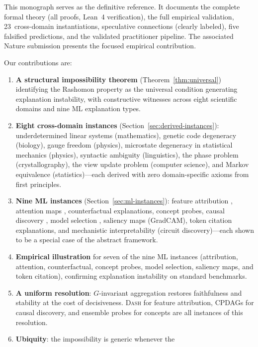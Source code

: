 \documentclass[11pt,a4paper]{article}
\newcommand{\DASH}{\textsc{Dash}}
\begin{document}
This monograph serves as the definitive reference.  It documents the
complete formal theory (all proofs, Lean~4 verification), the full
empirical validation, 23~cross-domain instantiations, speculative
connections (clearly labeled), five falsified predictions, and the
validated practitioner pipeline.  The associated Nature submission
presents the focused empirical contribution.

Our contributions are:
\begin{enumerate}[label=(\arabic*)]
  \item \textbf{A structural impossibility theorem}
    (Theorem~\ref{thm:universal}) identifying the Rashomon property
    as the universal condition generating explanation instability,
    with constructive witnesses across eight scientific domains and
    nine ML explanation types.
  \item \textbf{Eight cross-domain instances}
    (Section~\ref{sec:derived-instances}): underdetermined linear systems
    (mathematics), genetic code degeneracy (biology), gauge freedom
    (physics), microstate degeneracy in statistical mechanics (physics),
    syntactic ambiguity (linguistics), the phase problem
    (crystallography), the view update problem (computer science), and
    Markov equivalence (statistics)---each derived with zero domain-specific axioms from
    first principles.
  \item \textbf{Nine ML instances}
    (Section~\ref{sec:ml-instances}): feature attribution
    \citep{bilodeau2024impossibility}, attention maps
    \citep{jainwallace2019}, counterfactual explanations, concept probes,
    causal discovery \citep{verma1991equivalence}, model selection
    \citep{rudin2024amazing}, saliency maps (GradCAM), token citation explanations,
    and mechanistic interpretability (circuit
    discovery)---each shown to be a special case of the abstract framework.
  \item \textbf{Empirical illustration} for seven of the nine ML instances
    (attribution, attention, counterfactual, concept probes, model selection, saliency maps, and token citation),
    confirming explanation instability on standard benchmarks.
  \item \textbf{A uniform resolution}: $G$-invariant aggregation restores
    faithfulness and stability at the cost of decisiveness.  \DASH{} for
    feature attribution, CPDAGs for causal discovery, and ensemble probes
    for concepts are all instances of this resolution.
  \item \textbf{Ubiquity}: the impossibility is generic whenever the

\end{enumerate}
\end{document}
